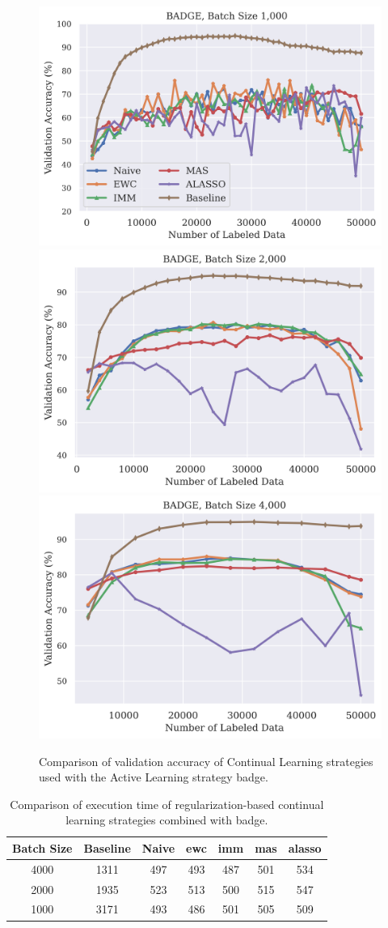 \begin{figure}[h]
    \centering
    \includegraphics[width=0.32\linewidth]{images/results_CAL/badge_1000b_Comp.png} \hfill
    \includegraphics[width=0.32\linewidth]{images/results_CAL/badge_2000b_acc.png} \hfill
    \includegraphics[width=0.32\linewidth]{images/results_CAL/badge_4000b_acc.png}
    \caption[Continual Active Learning with \gls{badge} with varying batch size]{Comparison of validation accuracy of Continual Learning strategies used with the Active Learning strategy
    \gls{badge}.}
    \label{fig:Evaluation:CAL:VaryBatchSizeAcc}
\end{figure}


\begin{table}[h]
    \centering
    \begin{tabular}{c | c c c c c c} 
        Batch Size & Baseline & Naive & \gls{ewc} & \gls{imm} & \gls{mas} & \gls{alasso}\\ 
        \hline 
        4000 & 1311 & 497 & 493 & 487 & 501 & 534 \\
        2000 & 1935 & 523 & 513 & 500 & 515 & 547 \\
        1000 & 3171 & 493 & 486 & 501 & 505 & 509 \\
    \end{tabular}
    \caption{Comparison of execution time of regularization-based continual learning strategies
    combined with \gls{badge}.}
    \label{fig:Evaluation:CAL:BadgeVaryBatchSizeTime}
\end{table}

